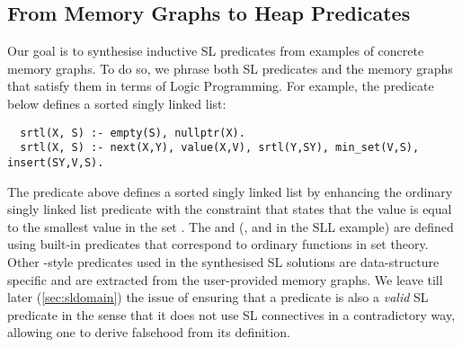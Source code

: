 

  
\subsection{From  Memory Graphs to Heap Predicates}
\label{sec:popper}

Our goal is to synthesise inductive SL predicates from examples of
concrete memory graphs.
%
To do so, we phrase both SL predicates and the memory graphs that
satisfy them in terms of Logic Programming. For example, the \prolog
predicate below defines a sorted singly linked list:
%
\begin{verbatim}
  srtl(X, S) :- empty(S), nullptr(X).
  srtl(X, S) :- next(X,Y), value(X,V), srtl(Y,SY), min_set(V,S), insert(SY,V,S).
\end{verbatim}
%
The predicate above defines a sorted singly linked list by enhancing
the ordinary singly linked list predicate with the constraint
 that states that the value  is equal to
the smallest value in the set . The 
and  (\ie,  and 
in the SLL example) are defined using \prolog built-in predicates that
correspond to ordinary functions in set theory.
%
Other \prolog-style predicates used in the synthesised SL solutions
are data-structure specific and are extracted from the user-provided
memory graphs.
%
We leave till later (\autoref{sec:sldomain}) the issue of ensuring
that a \prolog predicate is also a \emph{valid} SL predicate in the
sense that it does not use SL connectives in a contradictory way,
allowing one to derive falsehood from its definition.


%
%

